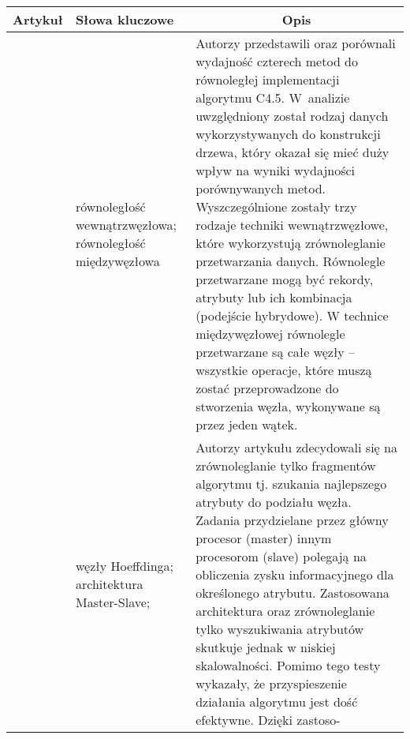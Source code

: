 \documentclass[12pt]{article}
\begin{document}
    \begin{center}

        \begin{longtable}{| c | p{} | p{} |}

            \hline
            
            \textbf{Artykuł} &\textbf{Słowa kluczowe} & \multicolumn{1}{|c|}{\textbf{Opis}}
            
            \\ \hline \hline 

            \cite{parallelization-of-decision-tree-al} &

            równoległość wewnątrzwęzłowa; równoległość międzywęzłowa &

            Autorzy przedstawili oraz porównali wydajność czterech metod do równoległej implementacji algorytmu C4.5.
            W~analizie uwzględniony został rodzaj danych wykorzystywanych do konstrukcji drzewa, który okazał
            się mieć duży wpływ na wyniki wydajności porównywanych metod. Wyszczególnione zostały trzy rodzaje
            techniki wewnątrzwęzłowe, które wykorzystują zrównoleglanie przetwarzania danych. Równolegle
            przetwarzane mogą być rekordy, atrybuty lub ich kombinacja (podejście hybrydowe). W technice międzywęzłowej
            równolegle przetwarzane są całe węzły -- wszystkie operacje, które muszą zostać przeprowadzone do stworzenia
            węzła, wykonywane są przez jeden wątek. \\
            
            \hline

            \cite{parallel-hoeffding-decision-tree} &

            węzły Hoeffdinga; architektura Master-Slave; &

            Autorzy artykułu zdecydowali się na zrównoleglanie tylko fragmentów algorytmu tj. szukania
            najlepszego atrybuty do podziału węzła. Zadania przydzielane przez główny procesor
            (master) innym procesorom (slave) polegają na obliczenia zysku informacyjnego dla określonego
            atrybutu. Zastosowana architektura oraz zrównoleglanie tylko wyszukiwania atrybutów skutkuje
            jednak w niskiej skalowalności. Pomimo tego testy wykazały, że przyspieszenie działania algorytmu
            jest dość efektywne. Dzięki zastoso- \\
            

\end{longtable}
\end{center}
\end{document}
